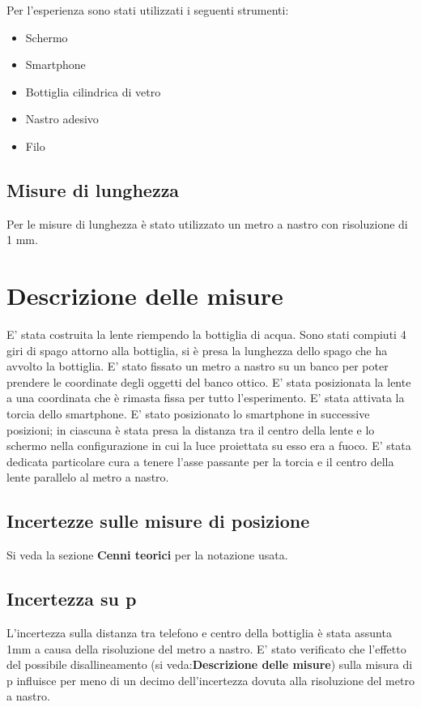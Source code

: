\documentclass{article}
\begin{document}
Per l'esperienza sono stati utilizzati i seguenti strumenti:
\begin{itemize}

\item Schermo
\item Smartphone
\item Bottiglia cilindrica di vetro
\item Nastro adesivo
\item Filo
\end{itemize}


\subsection{Misure di lunghezza}
Per le misure di lunghezza è stato utilizzato un metro a nastro con risoluzione di 1 mm.



\section{Descrizione delle misure}

E' stata costruita la lente riempendo la bottiglia di acqua.
Sono stati compiuti 4 giri di spago attorno alla bottiglia, si è presa la lunghezza dello spago che ha avvolto la bottiglia.
E' stato fissato un metro  a nastro su un banco per poter prendere le coordinate degli oggetti del banco ottico.
E' stata posizionata la lente a una coordinata che è rimasta fissa per tutto l'esperimento.
E' stata attivata la torcia dello smartphone.
E' stato posizionato lo smartphone in successive posizioni; in ciascuna è  stata presa la distanza tra il centro della lente e lo schermo nella configurazione in cui la luce proiettata su esso era a fuoco.
E' stata dedicata particolare cura a tenere l'asse passante per la torcia e il centro della lente  parallelo al metro a nastro.

\subsection{Incertezze sulle misure di posizione}

Si veda la sezione \textbf{Cenni teorici} per la notazione usata.

\subsection{Incertezza su p}
L'incertezza sulla distanza tra telefono e centro della bottiglia è stata assunta 1mm a causa della risoluzione del metro a nastro.
E' stato verificato che l'effetto del possibile disallineamento (si veda:\textbf{Descrizione delle misure}) sulla misura di p influisce per meno di un decimo dell'incertezza dovuta alla risoluzione del metro a nastro. 
\end{document}
